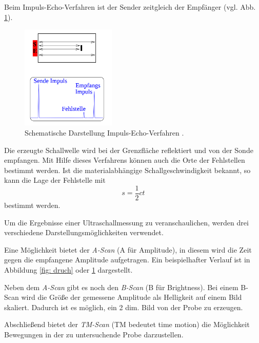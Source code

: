 Beim Impuls-Echo-Verfahren ist der Sender zeitgleich der Empfänger (vgl. Abb. \ref{fig: echo}).
\begin{figure}[h]
  \centering
  \includegraphics[width=0.4\textwidth]{pics/impuls_echo.png}
  \caption{Schematische Darstellung Impuls-Echo-Verfahren \cite{anleitungus1}.}
  \label{fig: echo}
  \end{figure}
Die erzeugte Schallwelle wird bei der Grenzfläche reflektiert und von der Sonde
empfangen. Mit Hilfe dieses Verfahrens können auch die Orte der Fehlstellen bestimmt
werden. Ist die materialabhängige Schallgeschwindigkeit bekannt, so kann die
Lage der Fehlstelle mit
\begin{equation}
  \label{eq:lage_fehl}
  s=\frac{1}{2}ct
\end{equation}
bestimmt werden.

Um die Ergebnisse einer Ultraschallmessung zu veranschaulichen, werden drei verschiedene
Darstellungsmöglichkeiten verwendet.

Eine Möglichkeit bietet der \emph{A-Scan} (A für Amplitude), in diesem
wird die Zeit gegen die empfangene  Amplitude aufgetragen.
Ein beispielhafter Verlauf ist in Abbildung \ref{fig: druch} oder \ref{fig: echo}
dargestellt.

Neben dem \emph{A-Scan} gibt es noch den \emph{B-Scan} (B für Brightness).
Bei einem B-Scan wird die Größe der gemessene Amplitude als Helligkeit
auf einem Bild skaliert. Dadurch ist es möglich, ein 2 dim. Bild von der Probe zu erzeugen.

Abschließend bietet der \emph{TM-Scan} (TM bedeutet time motion) die Möglichkeit
Bewegungen in der zu untersuchende Probe darzustellen.
